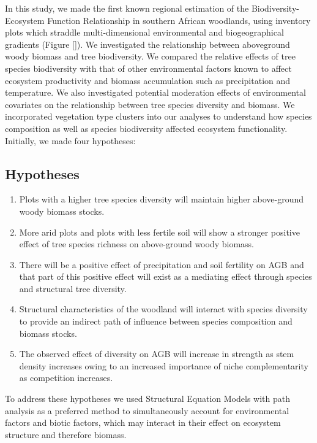 \documentclass[11pt,a4paper]{article}
\begin{document}
In this study, we made the first known regional estimation of the Biodiversity-Ecosystem Function Relationship in southern African woodlands, using inventory plots which straddle multi-dimensional environmental and biogeographical gradients (Figure \autoref{}). We investigated the relationship between aboveground woody biomass and tree biodiversity. We compared the relative effects of tree species biodiversity with that of other environmental factors known to affect ecosystem productivity and biomass accumulation such as precipitation and temperature. We also investigated potential moderation effects of environmental covariates on the relationship between tree species diversity and biomass. We incorporated vegetation type clusters \citep{} into our analyses to understand how species composition as well as species biodiversity affected ecosystem functionality. Initially, we made four hypotheses: 

\subsection{Hypotheses}

\begin{enumerate}
	\item{Plots with a higher tree species diversity will maintain higher above-ground woody biomass stocks.}
	\item{More arid plots and plots with less fertile soil will show a stronger positive effect of tree species richness on above-ground woody biomass.} 
	\item{There will be a positive effect of precipitation and soil fertility on AGB and that part of this positive effect will exist as a mediating effect through species and structural tree diversity.}
	\item{Structural characteristics of the woodland will interact with species diversity to provide an indirect path of influence between species composition and biomass stocks.}
	\item{The observed effect of diversity on AGB will increase in strength as stem density increases owing to an increased importance of niche complementarity as competition increases.}
\end{enumerate}

To address these hypotheses we used Structural Equation Models with path analysis as a preferred method to simultaneously account for environmental factors and biotic factors, which may interact in their effect on ecosystem structure and therefore biomass.
\end{document}
